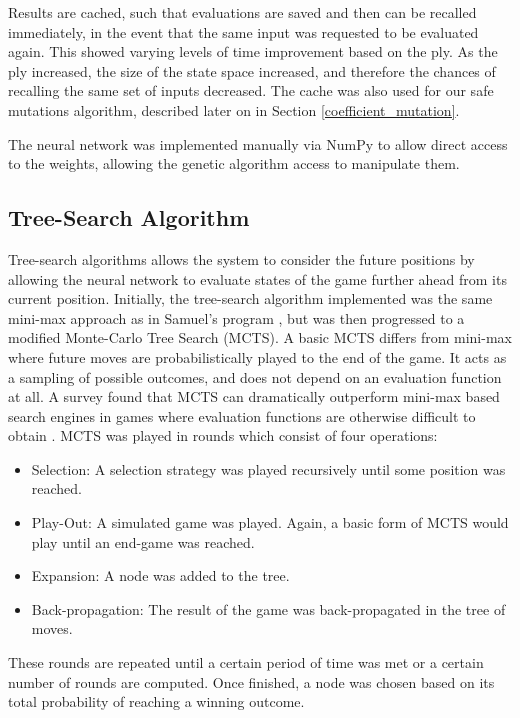 \documentclass[12pt,a4paper]{article}
\begin{document}
        Results are cached, such that evaluations are saved and then can be recalled immediately, in the event that the same input was requested to be  evaluated again. This showed  varying levels of time improvement based on the ply. As the ply increased, the size of the state space increased, and therefore the chances of recalling the same set of inputs decreased. The cache was also used for our safe mutations algorithm, described later on in Section \ref{coefficient_mutation}.

        The neural network was implemented manually via NumPy to allow direct access to the weights, allowing the genetic algorithm access to manipulate them.
    
    \subsection{Tree-Search Algorithm}
        Tree-search algorithms allows the system to consider the future positions by allowing the neural network to evaluate states of the game further ahead from its current position. Initially, the tree-search algorithm implemented was the same mini-max approach as in Samuel's program \cite{samuel_studies_1959}, but was then progressed to a modified Monte-Carlo Tree Search (MCTS). A basic MCTS differs from mini-max where future moves are probabilistically played to the end of the game. It acts as a sampling of possible outcomes, and does not depend on an evaluation function at all. A survey found that MCTS can dramatically outperform mini-max based search engines in games where evaluation functions are otherwise difficult to obtain \cite{browne_survey_2012}. MCTS was played in rounds which consist of four operations:

        \begin{itemize}
            \item Selection: A selection strategy was played recursively until some position was reached. 
            \item Play-Out: A simulated game was played. Again, a basic form of MCTS would play until an end-game was reached.
            \item Expansion: A node was added to the tree.
            \item Back-propagation: The result of the game was back-propagated in the tree of moves.
        \end{itemize}

        These rounds are repeated until a certain period of time was met or a certain number of rounds are computed. Once finished, a node was chosen based on its total probability of reaching a winning outcome.
\end{document}
